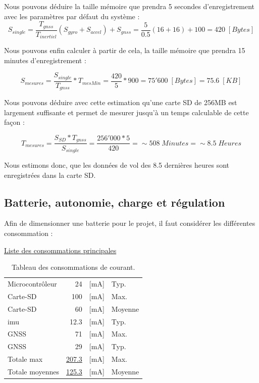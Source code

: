 Nous pouvons déduire la taille mémoire que prendra 5 secondes d'enregistrement avec les paramètres par défaut du système : 
\begin{equation*}
	S_{single} = \frac{T_{gnss}}{T_{inertiel}}(S_{gyro}+S_{accel}) + S_{gnss} = \frac{5}{0.5}(16+16) + 100 = 420 \; [Bytes]
\end{equation*}

Nous pouvons enfin calculer à partir de cela, la taille mémoire que prendra 15 minutes d'enregistrement : 

\begin{equation*}
	S_{mesures} = \frac{S_{single}}{T_{gnss}} * T_{mesMin} = \frac{420}{5} * 900 = 75'600 \; [Bytes] = 75.6 \; [KB]
\end{equation*}

Nous pouvons déduire avec cette estimation qu'une carte SD de 256MB est largement suffisante et permet de mesurer jusqu'à un temps calculable de cette façon :

\begin{equation*}
	T_{mesures} = \frac{S_{SD}*T_{gnss}}{S_{single}} = \frac{256'000*5}{420} = \sim508 \; Minutes = \sim8.5 \; Heures
\end{equation*}

Nous estimons donc, que les données de vol des 8.5 dernières heures sont enregistrées dans la carte SD.

\clearpage

\subsection{Batterie, autonomie, charge et régulation} 
Afin de dimensionner une batterie pour le projet, il faut considérer les différentes consommation :

\begin{center}
	\underline{Liste des consommations principales} \\
	\begin{table}[h]
		\centering
		\begin{tabular}{lrll}
			Microcontrôleur & 24 & [mA] & Typ. \\
			Carte-SD & ~100 & [mA] & Max. \\
			Carte-SD & ~60 & [mA] & Moyenne \\
			\gls{imu} & 12.3 & [mA] & Typ. \\
			\gls{GNSS} & 71 & [mA] & Max. \\
			\gls{GNSS} & 29 & [mA] & Typ. \\
			\hline
			Totale max & \underline{207.3} & [mA] & Max. \\
			Totale moyennes & \underline{125.3} & [mA] & Moyenne \\
			\hline
		\end{tabular}
		\caption{Tableau des consommations de courant.}
		\label{tab:consommateur}
	\end{table}
\end{center}

